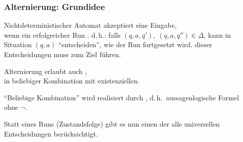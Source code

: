   \begin{frame}
    \frametitle{Alternierung: Grundidee}
    
    \begin{Itemize}
      \item
        Nichtdeterministischer Automat  akzeptiert eine Eingabe, \\
        wenn ein erfolgreicher Run .
        \parI
        d.\,h.: falls $(q,a,q'),~(q,a,q'') \in \Delta$, kann  in Situation $(q,a)$ "`entscheiden"',
        wie der Run fortgesetzt wird.
        \parI
         dieser Entscheidungen muss zum Ziel führen.
        \parI
      \item
        Alternierung erlaubt auch , \\
        in beliebiger Kombination mit existenziellen.
        \parI
      \item
        "`Beliebige Kombination"' wird realisiert durch ,
        d.\,h.\ aussagenlogische Formel ohne $\lnot$.
        \parI
      \item
        Statt eines Runs (Zustandsfolge) gibt es nun einen 
        der alle universellen Entscheidungen berücksichtigt.
    \end{Itemize}

  \end{frame}

